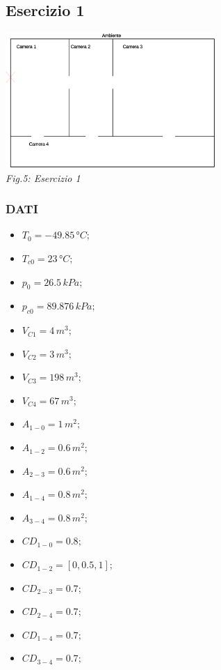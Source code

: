 \documentclass{article}
\begin{document}
        \pagebreak
        \subsection{Esercizio 1\label{Es1}} 

        \begin{center}
            \includegraphics[width=0.6\textwidth]{ES1_Esercizio1.eps}\\ 
            \textit{Fig.5: Esercizio 1}\\ 
        \end{center}
        \subsubsection{DATI}
        \begin{itemize}
            \item $\displaystyle T_0 = -49.85\,°C;$ \
            \item $\displaystyle T_{c0} = 23\,°C;$ \
            \item $\displaystyle p_0 = 26.5\,kPa;$ \
            \item $\displaystyle p_{c0} = 89.876\,kPa;$ \
            \item $\displaystyle V_{C1} = 4\,m^3;$ \
            \item $\displaystyle V_{C2} = 3\,m^3;$ \
            \item $\displaystyle V_{C3} = 198\,m^3;$ \
            \item $\displaystyle V_{C4} = 67\,m^3;$ \
            \item $\displaystyle A_{1-0} = 1\,m^2;$ \
            \item $\displaystyle A_{1-2} = 0.6\,m^2;$ \
            \item $\displaystyle A_{2-3} = 0.6\,m^2;$ \
            \item $\displaystyle A_{1-4} = 0.8\,m^2;$ \
            \item $\displaystyle A_{3-4} = 0.8\,m^2;$ \
            \item $\displaystyle CD_{1-0} = 0.8;$ \
            \item $\displaystyle CD_{1-2} = [0, 0.5, 1];$ \
            \item $\displaystyle CD_{2-3} = 0.7;$ \
            \item $\displaystyle CD_{2-4} = 0.7;$ \
            \item $\displaystyle CD_{1-4} = 0.7;$ \
            \item $\displaystyle CD_{3-4} = 0.7;$ \
        \end{itemize}
        \pagebreak
\end{document}
